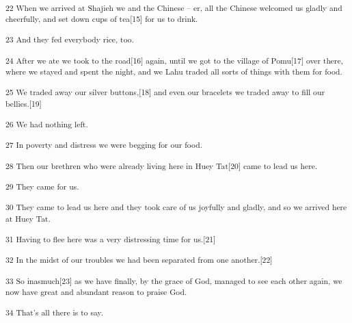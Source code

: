 {\textsuperscript{22 When we arrived at Shajieh we and the Chinese -- er,
all the Chinese welcomed us gladly and cheerfully, and set down cups of tea[15]
for us to drink. }}

{\textsuperscript{23 And they fed everybody rice, too. }}

{\textsuperscript{24 After we ate we took to the road[16] again, until we
got to the village of Pomu[17] over there, where we stayed and spent the night,
and we Lahu traded all sorts of things with them for food.}}

{\textsuperscript{25 We traded away our silver buttons,[18] and even our
bracelets we traded away to fill our bellies.[19]}}

{\textsuperscript{26 We had nothing left. }}

{\textsuperscript{27 In poverty and distress we were begging for our food.}}

{\textsuperscript{28 Then our brethren who were already living here in Huey
Tat[20] came to lead us here. }}

{\textsuperscript{29 They came for us. }}

{\textsuperscript{30 They came to lead us here and they took care of us
joyfully and gladly, and so we arrived here at Huey Tat. }}

{\textsuperscript{31 Having to flee here was a very distressing time for
us.[21]}}

{\textsuperscript{32 In the midst of our troubles we had been separated
from one another.[22]}}

{\textsuperscript{33 So inasmuch[23] as we have finally, by the grace of
God, managed to see each other again, we now have great and abundant reason to
praise God. }}

{\textsuperscript{34 That's all there is to say.}}

